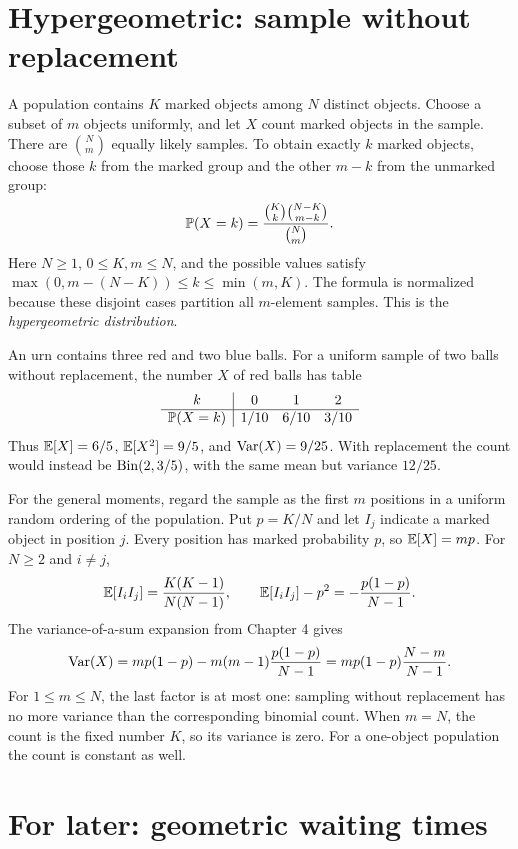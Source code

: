 \section{Hypergeometric: sample without replacement}
\label{sec:hypergeometric}

A population contains $K$ marked objects among $N$ distinct objects.
Choose a subset of $m$ objects uniformly, and let $X$ count marked objects
in the sample. There are $\binom Nm$ equally likely samples.
To obtain exactly $k$ marked objects, choose those $k$ from the marked
group and the other $m-k$ from the unmarked group:
\[
 \P(X=k)=\frac{\binom Kk\binom{N-K}{m-k}}{\binom Nm}.
\]
Here $N\ge1$, $0\le K,m\le N$, and the possible values satisfy
$\max(0,m-(N-K))\le k\le\min(m,K)$.
The formula is normalized because these disjoint cases partition all
$m$-element samples. This is the \emph{hypergeometric distribution}.

\begin{example}
An urn contains three red and two blue balls. For a uniform sample of
two balls without replacement, the number $X$ of red balls has table
\[
\begin{array}{c|ccc}
k&0&1&2\\\hline
\P(X=k)&1/10&6/10&3/10
\end{array}
\]
Thus $\E[X]=6/5$, $\E[X^2]=9/5$, and $\Var(X)=9/25$.
With replacement the count would instead be $\Bin(2,3/5)$, with the
same mean but variance $12/25$.
\end{example}

For the general moments, regard the sample as the first $m$ positions
in a uniform random ordering of the population.
Put $p=K/N$ and let $I_j$ indicate a marked object in position $j$.
Every position has marked probability $p$, so $\E[X]=mp$.
For $N\ge2$ and $i\ne j$,
\[
 \E[I_iI_j]=\frac{K(K-1)}{N(N-1)},\qquad
 \E[I_iI_j]-p^2=-\frac{p(1-p)}{N-1}.
\]
The variance-of-a-sum expansion from Chapter 4 gives
\[
 \Var(X)=mp(1-p)-m(m-1)\frac{p(1-p)}{N-1}
        =mp(1-p)\frac{N-m}{N-1}.
\]
For $1\le m\le N$, the last factor is at most one: sampling without
replacement has no more variance than the corresponding binomial count.
When $m=N$, the count is the fixed number $K$, so its variance is zero.
For a one-object population the count is constant as well.

\section{For later: geometric waiting times}
\label{sec:geometric}

